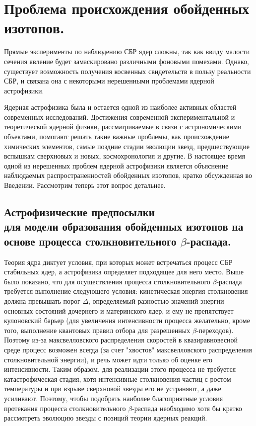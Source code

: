 \chapter{Проблема происхождения обойденных изотопов.}

Прямые эксперименты по наблюдению  СБР ядер  сложны, так как
ввиду малости сечения явление будет замаскировано различными фоновыми
помехами. Однако, существует возможность получения косвенных свидетельств
в пользу реальности СБР, и связана она с некоторыми нерешенными проблемами
ядерной астрофизики.

  Ядерная астрофизика была и остается одной из наиболее активных областей
современных исследований. Достижения современной экспериментальной и теоретической
ядерной физики, рассматриваемые в связи с астрономическими объектами,
помогают решать такие важные проблемы, как происхождение химических элементов,
самые поздние стадии эволюции звезд, предшествующие вспышкам сверхновых и новых,
космохронология и другие.
В настоящее время одной из нерешенных проблем ядерной астрофизики является объяснение
наблюдаемых распространенностей
обойденных изотопов, кратко обсужденная во Введении. Рассмотрим теперь этот
вопрос детальнее.


\section{Астрофизические предпосылки \\ для модели образования
обойденных изотопов на основе
процесса столкновительного $\beta$-распада.}

Теория ядра диктует условия, при которых может встречаться процесс СБР стабильных
ядер, а астрофизика определяет подходящее для него место. Выше было показано, что
для осуществления процесса столкновительного $\beta$-распада требуется выполнение
следующего условия: кинетическая энергия столкновения должна превышать порог $\Delta$,
определяемый разностью значений энергии основных состояний дочернего и материнского
ядер, и ему не препятствует кулоновский барьер
(для увеличения интенсивности процесса желательно, кроме того, выполнение
квантовых правил отбора для разрешенных $\beta$-переходов).
Поэтому из-за максвелловского
распределения скоростей в квазиравновесной среде процесс возможен всегда
(за счет "хвостов" максвелловского распределения столкновительной энергии), и речь
может идти только об оценке его интенсивности. Таким образом, для реализации
этого процесса не требуется катастрофическая стадия, хотя интенсивные столкновения
частиц с ростом температуры и при взрыве сверхновой звезды его не устраняют,
а даже усиливают. Поэтому, чтобы подобрать наиболее благоприятные условия протекания
процесса столкновительного $\beta$-распада необходимо хотя бы кратко рассмотреть
эволюцию  звезды с позиций теории ядерных реакций.


